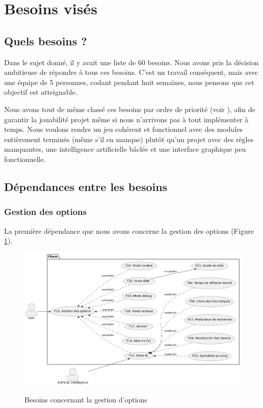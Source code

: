 \documentclass{article}
\begin{document}
\section{Besoins visés}
\subsection{Quels besoins ?}
Dans le sujet donné, il y avait une liste de 60 besoins.
Nous avons pris la décision ambitieuse de répondre à tous ces besoins. C'est un travail conséquent,
mais avec une équipe de 5 personnes, codant pendant huit semaines,
nous pensons que cet objectif est atteignable.

Nous avons tout de même classé ces besoins par ordre de priorité (voir ), afin de garantir
la jouabilité projet même si nous n'arrivons pas à tout implémenter à temps.
Nous voulons rendre un jeu cohérent et fonctionnel avec des modules entièrement
terminés (même s'il en manque) plutôt qu'un projet avec des règles manquantes,
une intelligence artificielle bâclée et une interface graphique peu fonctionnelle.

\subsection{Dépendances entre les besoins}
\subsubsection{Gestion des options}
La première dépendance que nous avons concerne la gestion des options (Figure \ref{fig:needs_options}).

\begin{figure}[h]
    \caption{Besoins concernant la gestion d'options}
    \centering
    \includegraphics[width=\textwidth,height=\textheight,keepaspectratio]{needs_options}
    \label{fig:needs_options}
\end{figure} 
\end{document}
